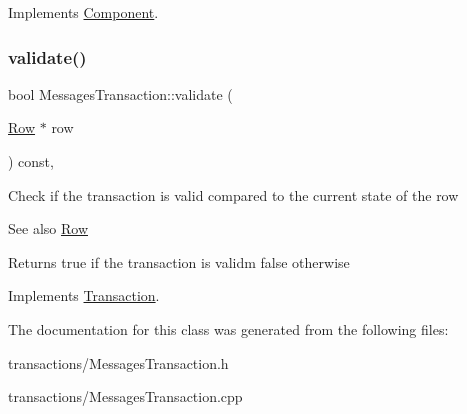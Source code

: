 Implements \mbox{\hyperlink{classComponent_a3e63d8c993e417a4af3f56d65ebfc7ea}{Component}}.

\mbox{\label{classMessagesTransaction_a59a0d03ac175701616ce341947f9cd64}} 
\subsubsection{\texorpdfstring{validate()}{validate()}}
{\footnotesize\ttfamily bool Messages\+Transaction\+::validate (\begin{DoxyParamCaption}\item[{\mbox{\hyperlink{classRow}{Row}} $\ast$}]{row }\end{DoxyParamCaption}) const\hspace{0.3cm}{\ttfamily [override]}, {\ttfamily [virtual]}}

Check if the transaction is valid compared to the current state of the row \begin{DoxySeeAlso}{See also}
\mbox{\hyperlink{classRow}{Row}}
\end{DoxySeeAlso}
\begin{DoxyReturn}{Returns}
true if the transaction is validm false otherwise 
\end{DoxyReturn}


Implements \mbox{\hyperlink{classTransaction_a638518143f0defde1c3c73e33db1b7f1}{Transaction}}.



The documentation for this class was generated from the following files\+:\begin{DoxyCompactItemize}
\item 
transactions/Messages\+Transaction.\+h\item 
transactions/Messages\+Transaction.\+cpp\end{DoxyCompactItemize}
